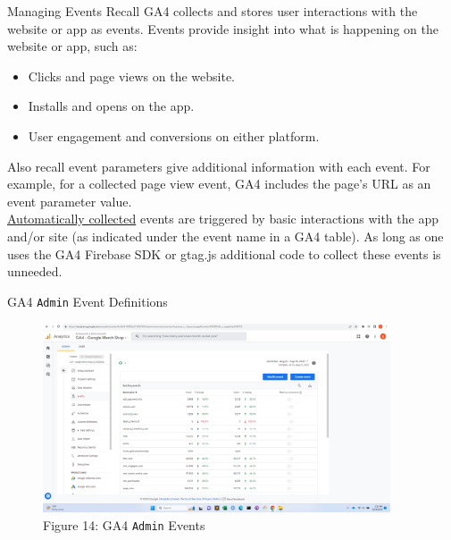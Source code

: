 \documentclass[pdf]{beamer}
\theoremstyle{remark}
\theoremstyle{definition}
\begin{document}
\begin{frame}[t]{Managing Events}
Recall GA4 collects and stores user interactions with the website or app as events. Events provide insight into what is happening on the website or app, such as: \\
\small
\begin{itemize}
  \item Clicks and page views on the website.
  \item Installs and opens on the app.
  \item User engagement and conversions on either platform.
\end{itemize}
\normalsize 
Also recall event parameters give additional information with each event.  For example, for a collected page view event, GA4 includes the page's URL as an event parameter value. \\
\vspace{1.5ex}
\underline{Automatically collected} events are triggered by basic interactions with the app and/or site (as indicated under the event name in a GA4 table). As long as one uses the GA4 Firebase SDK or gtag.js additional code to collect these events is unneeded.
\end{frame}

\begin{frame}[t]{GA4 \texttt{Admin} Event Definitions}
\begin{figure}[htbp]
  \captionsetup{justification=centering}
  \includegraphics[height=5.6cm, trim=1.5cm 0.0cm 2.0cm 0.0cm width=5.6cm]{Images/G4A_7a_091923_Admin_Events.png}
  \caption{Figure {\color{franklinblue} 14}: GA4 \texttt{Admin} Events}
\end{figure}
\end{frame}
\end{document}
